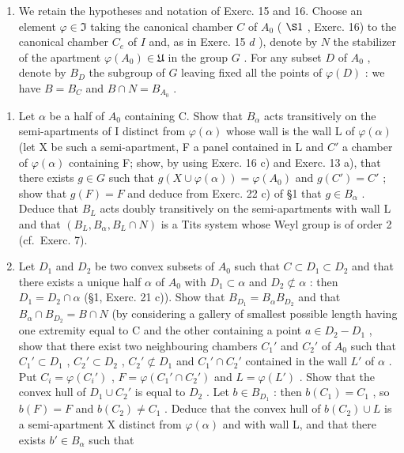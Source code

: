 \begin{enumerate}
\def\labelenumi{\arabic{enumi})}
\setcounter{enumi}{16}
\tightlist
\item
  We retain the hypotheses and notation of Exerc. 15 and 16. Choose an element \(\varphi \in \mathfrak{I}\) taking the canonical chamber \(C\) of \(A_0\) ( \(\S 1\) , Exerc. 16) to the canonical chamber \(C_e\) of \(I\) and, as in Exerc. 15 \(d\) ), denote by \(N\) the stabilizer of the apartment \(\varphi(A_0) \in \mathfrak{U}\) in the group \(G\) . For any subset \(D\) of \(A_0\) , denote by \(B_D\) the subgroup of \(G\) leaving fixed all the points of \(\varphi(D)\) : we have \(B = B_C\) and \(B \cap N = B_{A_0}\) .
\end{enumerate}

\begin{enumerate}
\def\labelenumi{\alph{enumi})}
\item
  Let \(\alpha\) be a half of \(A_0\) containing C. Show that \(B_{\alpha}\) acts transitively on the semi-apartments of I distinct from \(\varphi(\alpha)\) whose wall is the wall L of \(\varphi(\alpha)\) (let X be such a semi-apartment, F a panel contained in L and \(C'\) a chamber of \(\varphi(\alpha)\) containing F; show, by using Exerc. 16 c) and Exerc. 13 a), that there exists \(g \in G\) such that \(g(X \cup \varphi(\alpha)) = \varphi(A_0)\) and \(g(C') = C'\) ; show that \(g(F) = F\) and deduce from Exerc. 22 c) of §1 that \(g \in B_{\alpha}\) . Deduce that \(B_L\) acts doubly transitively on the semi-apartments with wall L and that \((B_L, B_{\alpha}, B_L \cap N)\) is a Tits system whose Weyl group is of order 2 (cf.~Exerc. 7).
\item
  Let \(D_{1}\) and \(D_{2}\) be two convex subsets of \(A_{0}\) such that \(C \subset D_{1} \subset D_{2}\) and that there exists a unique half \(\alpha\) of \(A_{0}\) with \(D_{1} \subset \alpha\) and \(D_{2} \not\subset \alpha\) : then \(D_{1} = D_{2} \cap \alpha\) (§1, Exerc. 21 c)). Show that \(B_{D_{1}} = B_{\alpha}B_{D_{2}}\) and that \(B_{\alpha} \cap B_{D_{2}} = B \cap N\) (by considering a gallery of smallest possible length having one extremity equal to C and the other containing a point \(a \in D_{2} - D_{1}\) , show that there exist two neighbouring chambers \(C_{1}'\) and \(C_{2}'\) of \(A_{0}\) such that \(C_{1}' \subset D_{1}\) , \(C_{2}' \subset D_{2}\) , \(C_{2}' \not\subset D_{1}\) and \(C_{1}' \cap C_{2}'\) contained in the wall \(L'\) of \(\alpha\) . Put \(C_{i} = \varphi(C_{i}')\) , \(F = \varphi(C_{1}' \cap C_{2}')\) and \(L = \varphi(L')\) . Show that the convex hull of \(D_{1} \cup C_{2}'\) is equal to \(D_{2}\) . Let \(b \in B_{D_{1}}\) : then \(b(C_{1}) = C_{1}\) , so \(b(F) = F\) and \(b(C_{2}) \neq C_{1}\) . Deduce that the convex hull of \(b(C_{2}) \cup L\) is a semi-apartment X distinct from \(\varphi(\alpha)\) and with wall L, and that there exists \(b' \in B_{\alpha}\) such that
\end{enumerate}

